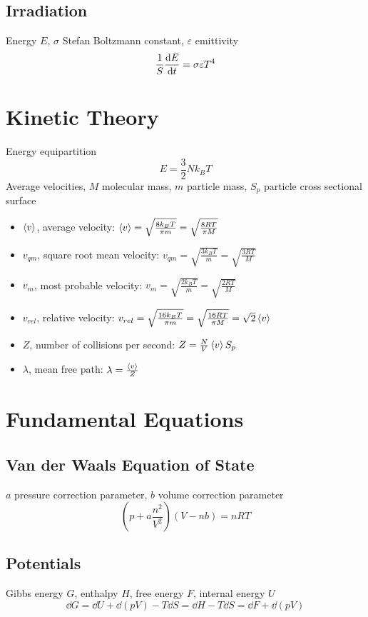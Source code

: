 \documentclass{aa}
\begin{document}
\subsection{Irradiation}
Energy $E$, $\sigma$ Stefan Boltzmann constant, $\varepsilon$ emittivity
\begin{equation}
	\frac{1}{S}\dv{E}{t}=\sigma\varepsilon T^4
\end{equation}
\section{Kinetic Theory}
Energy equipartition
\begin{equation}
	E= \frac{3}{2}Nk_BT
\end{equation}
Average velocities, $M$ molecular mass, $m$ particle mass, $S_p$ particle cross sectional surface
\begin{itemize}
\item $\expval{v}$, average velocity: $\expval{v}=\sqrt{\frac{8k_BT}{\pi m}}=\sqrt{\frac{8RT}{\pi M}}$\\
\item $v_{qm}$, square root mean velocity: $v_{qm}=\sqrt{\frac{3k_BT}{m}}=\sqrt{\frac{3RT}{M}}$\\
\item $v_{m}$, most probable velocity: $v_{m}=\sqrt{\frac{2k_BT}{m}}=\sqrt{\frac{2RT}{M}}$\\
\item $v_{rel}$, relative velocity: $v_{rel}=\sqrt{\frac{16k_BT}{\pi m}}=\sqrt{\frac{16RT}{\pi M}}=\sqrt{2}\expval{v}$\\
\item $Z$, number of collisions per second: $Z=\frac{N}{V}\expval{v}S_p$\\
\item $\lambda$, mean free path: $\lambda=\frac{\expval{v}}{Z}$
\end{itemize}
\section{Fundamental Equations}
\subsection{Van der Waals Equation of State}
$a$ pressure correction parameter, $b$ volume correction parameter
\begin{equation}
	\left( p+a\frac{n^2}{V^2} \right)\left( V-nb \right)=nRT
\end{equation}
\subsection{Potentials}
Gibbs energy $G$, enthalpy $H$, free energy $F$, internal energy $U$
\begin{equation}
	\dd G=\dd U+\dd\left( pV \right)-T\dd S=\dd H-T\dd S=\dd F+\dd\left( pV \right)
\end{equation}
\end{document}
